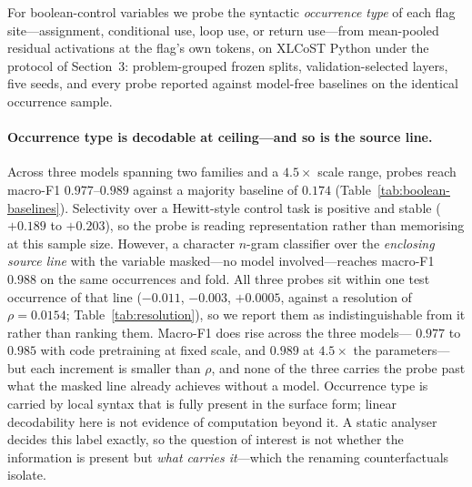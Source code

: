 %

\label{sec:boolean}
For boolean-control variables we probe the syntactic \emph{occurrence type}
of each flag site---assignment, conditional use, loop use, or return
use---from mean-pooled residual activations at the flag's own tokens, on
XLCoST Python under the protocol of Section~3: problem-grouped frozen
splits, validation-selected layers, five seeds, and every probe reported
against model-free baselines on the identical occurrence sample.

\paragraph{Occurrence type is decodable at ceiling---and so is the source
line.} Across three models spanning two families and a $4.5\times$ scale
range, probes reach macro-F1 $0.977$--$0.989$ against a majority baseline
of $0.174$ (Table~\ref{tab:boolean-baselines}). Selectivity over a
Hewitt-style control task \citep{hewitt2019control} is positive and stable
($+0.189$ to $+0.203$), so the probe is reading representation rather than
memorising at this sample size. However, a character $n$-gram classifier
over the \emph{enclosing source line} with the variable masked---no model
involved---reaches macro-F1 $0.988$ on the same occurrences and fold. All
three probes sit within one test occurrence of that line ($-0.011$,
$-0.003$, $+0.0005$, against a resolution of $\rho = 0.0154$;
Table~\ref{tab:resolution}), so we report them as indistinguishable from
it rather than ranking them. Macro-F1 does rise across the three models---
$0.977$ to $0.985$ with code pretraining at fixed scale, and $0.989$ at
$4.5\times$ the parameters---but each increment is smaller than $\rho$,
and none of the three carries the probe past what the masked line already
achieves without a model. Occurrence type is
carried by local syntax that is fully present in the surface form; linear
decodability here is not evidence of computation beyond it. A static
analyser decides this label exactly, so the question of interest is not
whether the information is present but \emph{what carries it}---which the
renaming counterfactuals isolate.

